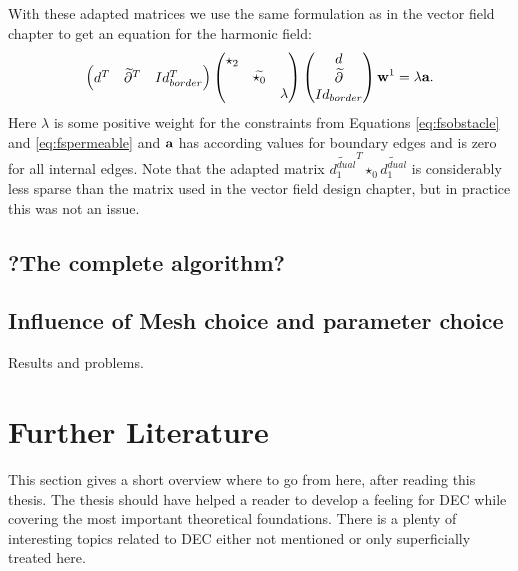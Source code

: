 With these adapted matrices we use the same formulation as in the vector field chapter to get an equation for the harmonic field:
\begin{equation}\begin{pmatrix} d^T & \widetilde{\partial}^T & Id_{border}^T \end{pmatrix} \begin{pmatrix}
\star_2 & & \\
 & \widetilde{\star_0} & \\
 & & \lambda
\end{pmatrix} \begin{pmatrix} d \\
\widetilde{\partial}\\
Id_{border}
\end{pmatrix} \textbf{w}^1= \lambda\textbf{a}.\label{eq:fsharmonic}\end{equation}
Here $\lambda$ is some positive weight for the constraints from Equations \ref{eq:fsobstacle} and \ref{eq:fspermeable} and $\textbf{a}$ has according values for boundary edges and is zero for all internal edges. 
Note that the adapted matrix $\widetilde{d_1^{dual}}^T \star_0 \widetilde{d_1^{dual}}$ is considerably less sparse than the matrix used in the vector field design chapter, but in practice this was not an issue.


\section{?The complete algorithm?}
\section{Influence of Mesh choice and parameter choice}
Results and problems.

\chapter{Further Literature}
This section gives a short overview where to go from here, after reading this thesis. The thesis should have helped a reader to develop a feeling for DEC while covering the most important theoretical foundations. There is a plenty of interesting topics related to DEC either not mentioned or only superficially treated here. 

